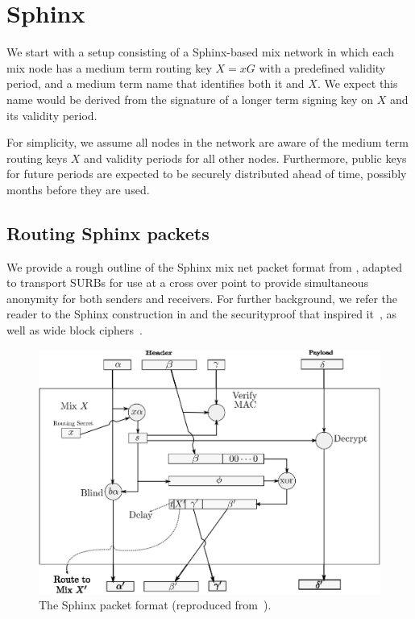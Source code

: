 
\section{Sphinx}

We start with a setup consisting of a Sphinx-based mix network in
which each mix node has a medium term routing key $X = x G$ with a
predefined validity period, and a medium term name that identifies
both it and $X$.  We expect this name would be derived from the
signature of a longer term signing key on $X$ and its validity period.

For simplicity, we assume all nodes in the network are aware of the
medium term routing keys $X$ and validity periods for all other nodes.
Furthermore, public keys for future periods are expected to be
securely distributed ahead of time, possibly months before they are
used.


\subsection{Routing Sphinx packets}

We provide a rough outline of the Sphinx mix net packet format from 
\cite{Sphinx}, adapted to transport SURBs for use at a cross over point
to provide simultaneous anonymity for both senders and receivers.
For further background, we refer the reader to the Sphinx construction
in \cite{Sphinx} and the securityproof that inspired it~\cite{FormalOnion},
as well as wide block ciphers~\cite{Lionness}.

\begin{figure}
  \begin{center}
  \includegraphics{sphinx1.eps}
  \end{center}
  \caption{The Sphinx packet format (reproduced from~\cite{Sphinx}).}
  \label{fig:sphinx}
\end{figure}

